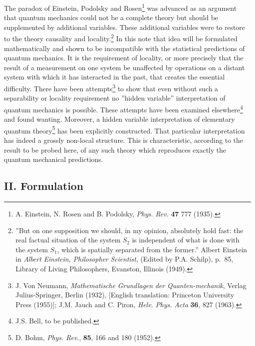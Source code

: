 The paradox of Einstein, Podolsky and Rosen\footnote{A. Einstein, N. Rosen and B. Podolsky, \emph{Phys. Rev.} \textbf{47} 777 (1935).} was advanced as an argument that quantum mechanics could not be a complete theory but should be supplemented by additional variables.  These additional variables were to restore to the theory causality and locality.\footnote{''But on one supposition we should, in my opinion, absolutely hold fast: the real factual situation of the system $S_2$ is independent of what is done with the system $S_1$, which is spatially separated from the former.'' Albert Einstein in \emph{Albert Einstein, Philosopher Scientist}, (Edited by P.A. Schilp), p.\ 85, Library of Living Philosophers, Evanston, Illinois (1949).}  In this note that idea will be formulated mathematically and shown to be incompatible with the statistical predictions of quantum mechanics.  It is the requirement of locality, or more precisely that the result of a measurement on one system be unaffected by operations on a distant system with which it has interacted in the past, that creates the essential difficulty.  There have been attempts\footnote{J. Von Neumann, \emph{Mathematische Grundlagen der Quanten-mechanik}, Verlag Julius-Springer, Berlin (1932), [English translation: Princeton University Press (1955)]; J.M. Jauch and C. Piron, \emph{Helv. Phys. Acta} \textbf{36}, 827 (1963).} to show that even without such a separability or locality requirement no ''hidden variable'' interpretation of quantum mechanics is possible.  These attempts have been examined elsewhere\footnote{J.S. Bell, to be published.} and found wanting.  Moreover, a hidden variable interpretation of elementary quantum theory\footnote{D. Bohm, \emph{Phys. Rev.}, \textbf{85}, 166 and 180 (1952).} has been explicitly constructed.  That particular interpretation has indeed a grossly non-local structure.  This is characteristic, according to the result to be probed here, of any such theory which reproduces exactly the quantum mechanical predictions.

\subsection*{II. Formulation}

